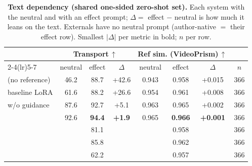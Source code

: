 \begin{table}[H]
    \centering
    \caption{\textbf{Text dependency (shared one-sided zero-shot set).} Each system with the neutral and with an effect prompt; $\Delta =$ effect $-$ neutral is how much it leans on the text. Externals have no neutral prompt (author-native $=$ their effect row). Smallest $|\Delta|$ per metric in bold; $n$ per row.}
    \label{tab:gridv3_text}
    \footnotesize
    \setlength{\tabcolsep}{3pt}
    \begin{tabular}{lccccccc}
        \toprule
        & \multicolumn{3}{c}{Transport\,$\uparrow$} & \multicolumn{3}{c}{Ref sim. (VideoPrism)\,$\uparrow$} & \\
        \cmidrule(lr){2-4}\cmidrule(lr){5-7}
        & neutral & effect & $\Delta$ & neutral & effect & $\Delta$ & $n$ \\
        \midrule
        \ltx{} (no reference) & 46.2 & 88.7 & +42.6 & 0.943 & 0.958 & +0.015 & 366 \\
        \ltx{} baseline LoRA & 61.6 & 88.2 & +26.6 & 0.954 & 0.961 & +0.008 & 366 \\
        \segue{} w/o guidance & 87.6 & 92.7 & +5.1 & 0.963 & 0.965 & +0.002 & 366 \\
        \segue{} & 92.6 & \textbf{94.4} & \textbf{+1.9} & 0.965 & \textbf{0.966} & \textbf{+0.001} & 366 \\
        \midrule
        \vap{} & \ph{--} & 81.1 & \ph{--} & \ph{--} & 0.958 & \ph{--} & 366 \\
        \vfxmaster{} & \ph{--} & 85.8 & \ph{--} & \ph{--} & 0.962 & \ph{--} & 366 \\
        {} & \ph{--} & 62.2 & \ph{--} & \ph{--} & 0.957 & \ph{--} & 366 \\
        \bottomrule
    \end{tabular}
\end{table}
